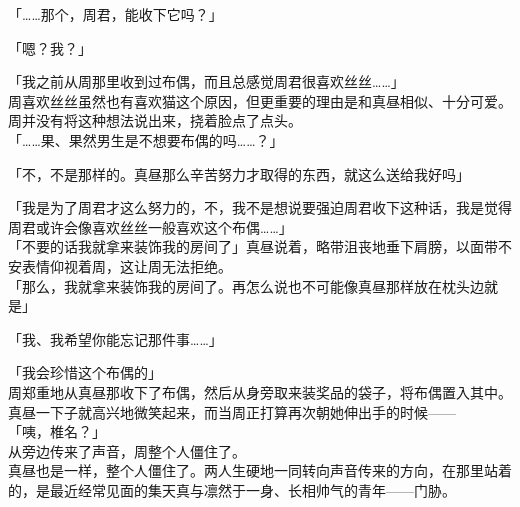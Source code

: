 「……那个，周君，能收下它吗？」

「嗯？我？」

「我之前从周那里收到过布偶，而且总感觉周君很喜欢丝丝……」\\

周喜欢丝丝虽然也有喜欢猫这个原因，但更重要的理由是和真昼相似、十分可爱。周并没有将这种想法说出来，挠着脸点了点头。\\

「……果、果然男生是不想要布偶的吗……？」

「不，不是那样的。真昼那么辛苦努力才取得的东西，就这么送给我好吗」

「我是为了周君才这么努力的，不，我不是想说要强迫周君收下这种话，我是觉得周君或许会像喜欢丝丝一般喜欢这个布偶……」\\

「不要的话我就拿来装饰我的房间了」真昼说着，略带沮丧地垂下肩膀，以面带不安表情仰视着周，这让周无法拒绝。\\

「那么，我就拿来装饰我的房间了。再怎么说也不可能像真昼那样放在枕头边就是」

「我、我希望你能忘记那件事……」

「我会珍惜这个布偶的」\\

周郑重地从真昼那收下了布偶，然后从身旁取来装奖品的袋子，将布偶置入其中。\\

真昼一下子就高兴地微笑起来，而当周正打算再次朝她伸出手的时候——\\

「咦，椎名？」\\

从旁边传来了声音，周整个人僵住了。\\

真昼也是一样，整个人僵住了。两人生硬地一同转向声音传来的方向，在那里站着的，是最近经常见面的集天真与凛然于一身、长相帅气的青年——门胁。
